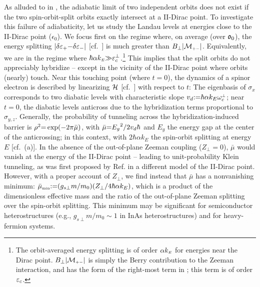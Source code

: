 \documentclass[aps, showpacs, twocolumn, notitlepage, superscriptaddress]{revtex4-1}
\begin{document}
As alluded to in , the adiabatic limit of two independent orbits does not exist if the two spin-orbit-split orbits exactly intersect at a II-Dirac point. To investigate this failure of adiabaticity, let us study the Landau levels at energies close to the II-Dirac point ($\epsilon_0$). We focus first on the regime where, on average (over $\mathfrak{o}_0$), the energy splitting $|\delta \varepsilon_+{-}\delta \varepsilon_-|$ [cf.\ ] is much greater than $B_\perp|{\cal M}_{\scriptscriptstyle{+-}}|$. Equivalently, we are in the regime where $\hbar\alpha k_{\scriptscriptstyle{E}}{\gg}\varepsilon_c^\perp$.\footnote{The orbit-averaged energy splitting is of order $\alpha k_{\scriptscriptstyle{E}}$ for energies near the Dirac point. $B_\perp|{\cal M}_{\scriptscriptstyle{+-}}|$ is simply the Berry contribution to the Zeeman interaction, and has the form of the right-most term in ; this term is of order $\varepsilon_c$.} This implies that the split orbits do not appreciably hybridize -- except in the vicinity of the II-Dirac point where orbits (nearly) touch.  Near this touching point (where $t{=}0$), the dynamics of a spinor electron is described by linearizing $\mathcal{H}$ [cf.\ ] with respect to $t$:
The eigenbasis of $\sigma_x$ corresponds to two diabatic levels with characteristic slope $v_d{:}{=}\hbar\alpha k_E\omega^{\scriptscriptstyle{\perp}}_c$; near $t{=}0$, the diabatic levels anticross  due to the hybridization terms proportional to $\sigma_{y,z}$. Generally, the probability of tunneling across the hybridization-induced barrier is  $\rho^2{=}\exp(-2\pi\bar{\mu})$, with $\bar{\mu}{=}{E_g}^2/{2v_d \hbar}$ and $E_g$ the energy gap at the center of the anticrossing\cite{wittig_landauzener_2005,lifshitz_e.m._quantum_1991}; in this context,
with $2\hbar\alpha k_E$ the spin-orbit splitting at energy $E$ [cf.\ (a)]. In the absence of the out-of-plane Zeeman coupling ($Z_\perp{=}0$), $\bar{\mu}$ would vanish at the energy of the II-Dirac point -- leading to unit-probability Klein tunneling, as was first proposed by Ref.  in a different model of the II-Dirac point. However, with a proper account of $Z_\perp$, we find instead that $\bar{\mu}$ has a nonvanishing minimum: $\bar{\mu}_{\scriptscriptstyle{\text{min}}}{:}{=} (g_{s\perp} m/m_0)(Z_\perp/4\hbar\alpha k_{E})$, which is a product of the dimensionless effective mass and the ratio of the out-of-plane Zeeman splitting over the spin-orbit splitting. This minimum may be significant for semiconductor heterostructures (e.g.,  $g_{s\perp}m/m_0{\sim} 1$ in InAs heterostructures\cite{pakmehr_g-factor_2015}) and  for heavy-fermion systems.
\end{document}
